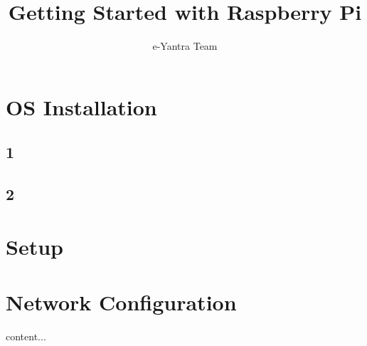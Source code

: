 \documentclass[a4paper,12pt]{report}
\title{Getting Started with Raspberry Pi}
\author{e-Yantra Team}
\begin{document}
	\maketitle
	\newpage
	\tableofcontents
	\newpage
	
	\chapter{OS Installation}
	\section{1}
	\section{2}
	\chapter{Setup}
	\chapter{Network Configuration}
	content...
\end{document}
